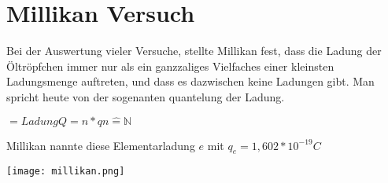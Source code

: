\documentclass{article}
\begin{document}
\section*{Millikan Versuch}

Bei der Auswertung vieler Versuche, stellte Millikan fest, dass die Ladung der Öltröpfchen immer nur als ein ganzzaliges Vielfaches einer kleinsten Ladungsmenge auftreten, und dass es dazwischen keine Ladungen gibt. Man spricht heute von der sogenanten quantelung der Ladung.

$= Ladung Q = n * q		n \widehat{=} \mathbb{N}$

Millikan nannte diese Elementarladung $e$ mit $q_e = 1,602*10^{-19}C$

\texttt{[image: millikan.png]}
\end{document}
